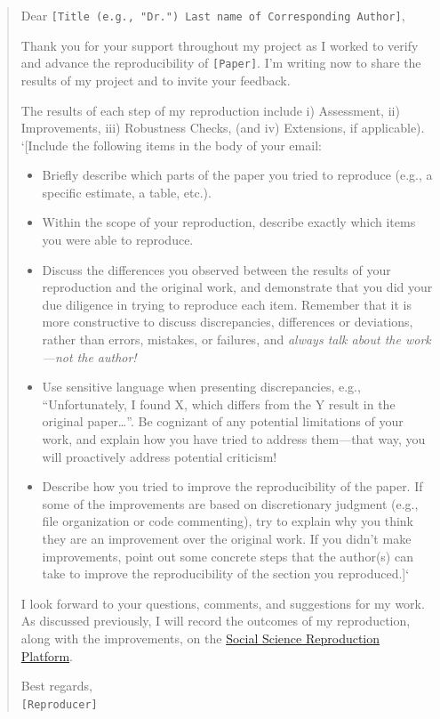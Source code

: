 \documentclass[
]{book}
\providecommand{\tightlist}{%
  \setlength{\itemsep}{0pt}\setlength{\parskip}{0pt}}
\begin{document}
\begin{quote}
Dear \texttt{{[}Title\ (e.g.,\ "Dr.")\ Last\ name\ of\ Corresponding\ Author{]}},

Thank you for your support throughout my project as I worked to verify and advance the reproducibility of \texttt{{[}Paper{]}}. I'm writing now to share the results of my project and to invite your feedback.

The results of each step of my reproduction include i) Assessment, ii) Improvements, iii) Robustness Checks, (and iv) Extensions, if applicable).\\
`{[}Include the following items in the body of your email:

\begin{itemize}
\tightlist
\item
  Briefly describe which parts of the paper you tried to reproduce (e.g., a specific estimate, a table, etc.).\\
\item
  Within the scope of your reproduction, describe exactly which items you were able to reproduce.\\
\item
  Discuss the differences you observed between the results of your reproduction and the original work, and demonstrate that you did your due diligence in trying to reproduce each item. Remember that it is more constructive to discuss discrepancies, differences or deviations, rather than errors, mistakes, or failures, and \emph{always talk about the work---not the author!}\\
\item
  Use sensitive language when presenting discrepancies, e.g., ``Unfortunately, I found X, which differs from the Y result in the original paper\ldots{}''. Be cognizant of any potential limitations of your work, and explain how you have tried to address them---that way, you will proactively address potential criticism!\\
\item
  Describe how you tried to improve the reproducibility of the paper. If some of the improvements are based on discretionary judgment (e.g., file organization or code commenting), try to explain why you think they are an improvement over the original work. If you didn't make improvements, point out some concrete steps that the author(s) can take to improve the reproducibility of the section you reproduced.{]}`
\end{itemize}

I look forward to your questions, comments, and suggestions for my work. As discussed previously, I will record the outcomes of my reproduction, along with the improvements, on the \href{https://www.socialsciencereproduction.org/}{Social Science Reproduction Platform}.

Best regards,\\
\texttt{{[}Reproducer{]}}
\end{quote}
\end{document}
